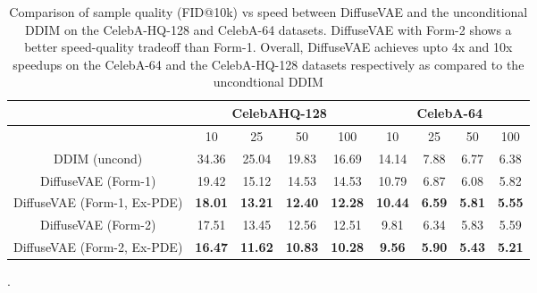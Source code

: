 \documentclass[10pt]{article} \usepackage[accepted]{tmlr}
\begin{document}
\begin{table}[t]
\scriptsize
\centering
\begin{tabular}{@{}ccccccccc@{}}
\toprule
         \multicolumn{1}{c|}{}                   & \multicolumn{4}{c|}{CelebAHQ-128}                                  & \multicolumn{4}{c}{CelebA-64}                                  \\ \midrule
                            & 10             & 25             & 50             & 100            & 10             & 25            & 50            & 100           \\ \midrule
DDIM (uncond)               & 34.36          & 25.04          & 19.83          & 16.69          & 14.14          & 7.88          & 6.77          & 6.38          \\ \midrule
DiffuseVAE (Form-1)         & 19.42          & 15.12          & 14.53          & 14.53          & 10.79          & 6.87          & 6.08          & 5.82          \\
DiffuseVAE (Form-1, Ex-PDE) & \textbf{18.01} & \textbf{13.21} & \textbf{12.40} & \textbf{12.28} & \textbf{10.44} & \textbf{6.59} & \textbf{5.81} & \textbf{5.55} \\ \midrule
DiffuseVAE (Form-2)         & 17.51          & 13.45          & 12.56          & 12.51          & 9.81           & 6.34          & 5.83          & 5.59          \\
DiffuseVAE (Form-2, Ex-PDE) & \textbf{16.47} & \textbf{11.62} & \textbf{10.83} & \textbf{10.28} & \textbf{9.56}  & \textbf{5.90} & \textbf{5.43} & \textbf{5.21} \\ \bottomrule
\end{tabular}
\caption{Comparison of sample quality (FID@10k) vs speed between DiffuseVAE and the unconditional DDIM on the CelebA-HQ-128 and CelebA-64 datasets. DiffuseVAE with Form-2 shows a better speed-quality tradeoff than Form-1. Overall, DiffuseVAE achieves upto 4x and 10x speedups on the CelebA-64 and the CelebA-HQ-128 datasets respectively as compared to the uncondtional DDIM}.
\label{table:svq_2}
\end{table}
\end{document}
